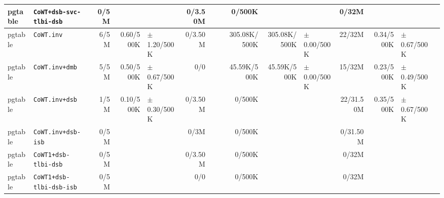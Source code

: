 \begin{tabular}{l l  | r r l | r r l | r r l | r r l l}
         pgtable &                               \verb|CoWT+dsb-svc-tlbi-dsb| &           0/5M &                       &                   &        0/3.50M &                       &                 &         0/500K &                       &                   &          0/32M &                       &                   & \\ \hline 
         pgtable &                                            \verb|CoWT.inv| &           6/5M &             0.60/500K &   $\pm$ 1.20/500K &        0/3.50M &                       &                 &   305.08K/500K &          305.08K/500K &   $\pm$ 0.00/500K &         22/32M &             0.34/500K &   $\pm$ 0.67/500K & \\ \hline 
         pgtable &                                        \verb|CoWT.inv+dmb| &           5/5M &             0.50/500K &   $\pm$ 0.67/500K &            0/0 &                       &                 &    45.59K/500K &           45.59K/500K &   $\pm$ 0.00/500K &         15/32M &             0.23/500K &   $\pm$ 0.49/500K & \\ \hline 
         pgtable &                                        \verb|CoWT.inv+dsb| &           1/5M &             0.10/500K &   $\pm$ 0.30/500K &        0/3.50M &                       &                 &         0/500K &                       &                   &      22/31.50M &             0.35/500K &   $\pm$ 0.67/500K & \\ \hline 
         pgtable &                                    \verb|CoWT.inv+dsb-isb| &           0/5M &                       &                   &           0/3M &                       &                 &         0/500K &                       &                   &       0/31.50M &                       &                   & \\ \hline 
         pgtable &                                  \verb|CoWT1+dsb-tlbi-dsb| &           0/5M &                       &                   &        0/3.50M &                       &                 &         0/500K &                       &                   &          0/32M &                       &                   & \\ \hline 
         pgtable &                              \verb|CoWT1+dsb-tlbi-dsb-isb| &           0/5M &                       &                   &            0/0 &                       &                 &         0/500K &                       &                   &          0/32M &                       &                   & \\ \hline 

\end{tabular}
